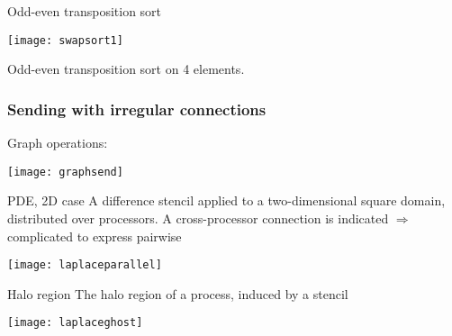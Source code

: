 \begin{exerciseframe}[bucketblock]
  
\end{exerciseframe}

\begin{frame}{Odd-even transposition sort}
  \label{fig:swapsort1}

  \texttt{[image: swapsort1]}

  Odd-even transposition sort on 4 elements.
\end{frame}

\begin{optexerciseframe}
  \footnotesize
%
  
\end{optexerciseframe}


\begin{frame}[containsverbatim]\frametitle{Sending with irregular connections}
  Graph operations:
  
  \texttt{[image: graphsend]}
\end{frame}

  
\begin{frame}{PDE, 2D case}
    A difference stencil applied to a two-dimensional square
    domain, distributed over processors. A cross-processor connection
    is indicated $\Rightarrow$ complicated to express pairwise

    \texttt{[image: laplaceparallel]}
\end{frame}

\begin{frame}{Halo region}
  The halo region of a process, induced by a stencil

  \texttt{[image: laplaceghost]}
\end{frame}

